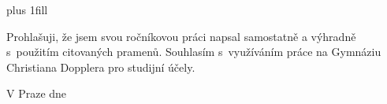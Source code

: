 \openright
\hypersetup{pageanchor=true}
\pagestyle{plain}
\vglue 0pt plus 1fill

\noindent
Prohlašuji, že jsem svou ročníkovou práci napsal samostatně a výhradně s~použitím citovaných pramenů. Souhlasím s~využíváním práce na Gymnáziu Christiana Dopplera pro studijní účely.
\vspace{10mm}

\noindent V Praze dne \DatumDokonceni
\hfill
\AutorPrace

\vspace{20mm}
\newpage

\openright
\pagestyle{plain}
\setcounter{page}{2}